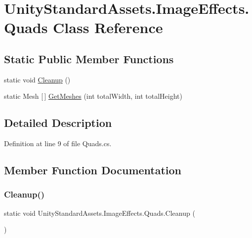 \hypertarget{class_unity_standard_assets_1_1_image_effects_1_1_quads}{}\section{Unity\+Standard\+Assets.\+Image\+Effects.\+Quads Class Reference}
\label{class_unity_standard_assets_1_1_image_effects_1_1_quads}
\subsection*{Static Public Member Functions}
\begin{DoxyCompactItemize}
\item 
static void \mbox{\hyperlink{class_unity_standard_assets_1_1_image_effects_1_1_quads_a885cb5fc635fc7c66966407af4a97ea6}{Cleanup}} ()
\item 
static Mesh \mbox{[}$\,$\mbox{]} \mbox{\hyperlink{class_unity_standard_assets_1_1_image_effects_1_1_quads_a6c31cbed0f5d3f850d2da956e4bdaddb}{Get\+Meshes}} (int total\+Width, int total\+Height)
\end{DoxyCompactItemize}


\subsection{Detailed Description}


Definition at line 9 of file Quads.\+cs.



\subsection{Member Function Documentation}
\mbox{\label{class_unity_standard_assets_1_1_image_effects_1_1_quads_a885cb5fc635fc7c66966407af4a97ea6}} 
\subsubsection{\texorpdfstring{Cleanup()}{Cleanup()}}
{\footnotesize\ttfamily static void Unity\+Standard\+Assets.\+Image\+Effects.\+Quads.\+Cleanup (\begin{DoxyParamCaption}{ }\end{DoxyParamCaption})\hspace{0.3cm}{\ttfamily [static]}}



